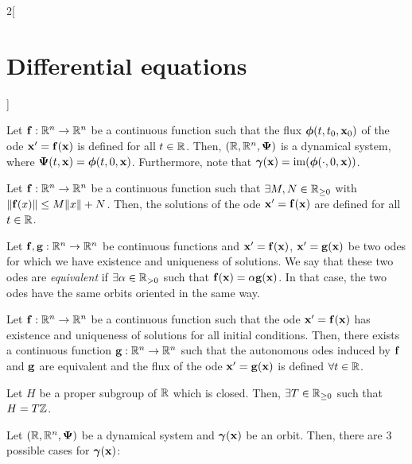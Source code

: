 \documentclass[../../../main.tex]{subfiles}
\begin{document}
\begin{multicols}{2}[\section{Differential equations}]
\begin{lemma}
    Let $\boldsymbol{\mathrm{f}}:\mathbb{R}^n\rightarrow\mathbb{R}^n$ be a continuous function such that the flux $\boldsymbol{\mathrm{\phi}}(t,t_0,\boldsymbol{\mathrm{x}}_0)$ of the ode $\boldsymbol{\mathrm{x}}' =\boldsymbol{\mathrm{f}}(\boldsymbol{\mathrm{x}})$ is defined for all $t\in\mathbb{R}$. Then, $(\mathbb{R},\mathbb{R}^n,\boldsymbol{\mathrm{\Psi}})$ is a dynamical system, where $\boldsymbol{\mathrm{\Psi}}(t,\boldsymbol{\mathrm{x}})=\boldsymbol{\mathrm{\phi}}(t,0,\boldsymbol{\mathrm{x}})$. Furthermore, note that $\boldsymbol{\mathrm{\gamma}}(\boldsymbol{\mathrm{x}})=\operatorname{im}(\boldsymbol{\mathrm{\phi}}(\cdot,0,\boldsymbol{\mathrm{x}}))$.
  \end{lemma}
  \begin{lemma}
    Let $\boldsymbol{\mathrm{f}}:\mathbb{R}^n\rightarrow\mathbb{R}^n$ be a continuous function such that $\exists M,N\in\mathbb{R}_{\geq 0}$ with $\|\boldsymbol{\mathrm{f}}(x)\|\leq M\|x\|+N$. Then, the solutions of the ode $\boldsymbol{\mathrm{x}}' =\boldsymbol{\mathrm{f}}(\boldsymbol{\mathrm{x}})$ are defined for all $t\in\mathbb{R}$.
  \end{lemma}
  \begin{definition}
    Let $\boldsymbol{\mathrm{f}},\boldsymbol{\mathrm{g}}:\mathbb{R}^n\rightarrow\mathbb{R}^n$ be continuous functions and $\boldsymbol{\mathrm{x}}' =\boldsymbol{\mathrm{f}}(\boldsymbol{\mathrm{x}})$, $\boldsymbol{\mathrm{x}}' =\boldsymbol{\mathrm{g}}(\boldsymbol{\mathrm{x}})$ be two odes for which we have existence and uniqueness of solutions. We say that these two odes are \textit{equivalent} if $\exists \alpha\in\mathbb{R}_{>0}$ such that $\boldsymbol{\mathrm{f}}(\boldsymbol{\mathrm{x}})=\alpha \boldsymbol{\mathrm{g}}(\boldsymbol{\mathrm{x}})$. In that case, the two odes have the same orbits oriented in the same way.
  \end{definition}
  \begin{corollary}
    Let $\boldsymbol{\mathrm{f}}:\mathbb{R}^n\rightarrow\mathbb{R}^n$ be a continuous function such that the ode $\boldsymbol{\mathrm{x}}' =\boldsymbol{\mathrm{f}}(\boldsymbol{\mathrm{x}})$ has existence and uniqueness of solutions for all initial conditions. Then, there exists a continuous function $\boldsymbol{\mathrm{g}}:\mathbb{R}^n\rightarrow\mathbb{R}^n$ such that the autonomous odes induced by $\boldsymbol{\mathrm{f}}$ and $\boldsymbol{\mathrm{g}}$ are equivalent and the flux of the ode $\boldsymbol{\mathrm{x}}' =\boldsymbol{\mathrm{g}}(\boldsymbol{\mathrm{x}})$ is defined $\forall t\in\mathbb{R}$.
  \end{corollary}
  \begin{lemma}
    Let $H$ be a proper subgroup of $\mathbb{R}$ which is closed. Then, $\exists T\in\mathbb{R}_{\geq 0}$ such that $H=T\mathbb{Z}$.
  \end{lemma}
  \begin{prop}
    Let $(\mathbb{R},\mathbb{R}^n,\boldsymbol{\mathrm{\Psi}})$ be a dynamical system and $\boldsymbol{\mathrm{\gamma}}(\boldsymbol{\mathrm{x}})$ be an orbit. Then, there are 3 possible cases for $\boldsymbol{\mathrm{\gamma}}(\boldsymbol{\mathrm{x}})$:

\end{prop}
\end{multicols}
\end{document}
